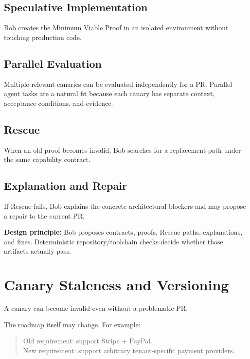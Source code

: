 \documentclass[12pt]{article}
\begin{document}
\subsection{Speculative Implementation}

Bob creates the Minimum Viable Proof in an isolated environment without touching production code.

\subsection{Parallel Evaluation}

Multiple relevant canaries can be evaluated independently for a PR. Parallel agent tasks are a natural fit because each canary has separate context, acceptance conditions, and evidence.

\subsection{Rescue}

When an old proof becomes invalid, Bob searches for a replacement path under the same capability contract.

\subsection{Explanation and Repair}

If Rescue fails, Bob explains the concrete architectural blockers and may propose a repair to the current PR.

\begin{notebox}
\textbf{Design principle:}
Bob proposes contracts, proofs, Rescue paths, explanations, and fixes. Deterministic repository/toolchain checks decide whether those artifacts actually pass.
\end{notebox}

\section{Canary Staleness and Versioning}

A canary can become invalid even without a problematic PR.

The roadmap itself may change. For example:

\begin{quote}
Old requirement: support Stripe + PayPal.\\
New requirement: support arbitrary tenant-specific payment providers.
\end{quote}
\end{document}
